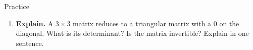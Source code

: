 \documentclass[10pt]{article}
\begin{document}
\begin{notesbox}{Practice}
\begin{enumerate}[leftmargin=1.9em, itemsep=11pt]
        $B=\begin{bmatrix} 2 & 0 \\ 1 & 4 \end{bmatrix}$. Compute $\det A$ and $\det B$, then find
        $\det(AB)$ (two ways: the product rule, and by multiplying $AB$ out). What is $\det A^{-1}$?
  \item \textbf{Explain.} A $3\times3$ matrix reduces to a triangular matrix with a $0$ on the diagonal.
        What is its determinant? Is the matrix invertible? Explain in one sentence.
\end{enumerate}
\end{notesbox}
\end{document}
